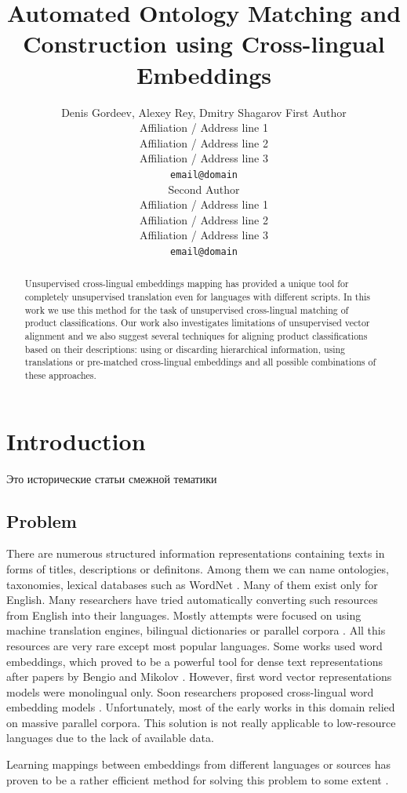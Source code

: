 \documentclass[11pt,a4paper]{article}
\title{Automated Ontology Matching and Construction using Cross-lingual Embeddings}
\author{Denis Gordeev, Alexey Rey, Dmitry Shagarov
	First Author \\
  Affiliation / Address line 1 \\
  Affiliation / Address line 2 \\
  Affiliation / Address line 3 \\
  \texttt{email@domain} \\\And
  Second Author \\
  Affiliation / Address line 1 \\
  Affiliation / Address line 2 \\
  Affiliation / Address line 3 \\
  \texttt{email@domain} \\}
\date{}
\begin{document}
\maketitle
\begin{abstract}
Unsupervised cross-lingual embeddings mapping has provided a unique tool for completely unsupervised translation even for languages with different scripts. In this work we use this method for the task of unsupervised cross-lingual matching of product classifications. Our work also investigates limitations of unsupervised vector alignment and we also suggest several techniques for aligning product classifications based on their descriptions: using or discarding hierarchical information, using translations or pre-matched cross-lingual embeddings and all possible combinations of these approaches.
\end{abstract}

\section{Introduction}
\foreignlanguage{russian}{Это исторические статьи смежной тематики}
\subsection{Problem}
There are numerous structured information representations containing texts in forms of titles, descriptions or definitons. Among them we can name ontologies, taxonomies, lexical databases such as WordNet \cite{wordnet}. Many of them exist only for English. Many researchers have tried automatically converting such resources from English into their languages. Mostly attempts were focused on using machine translation engines, bilingual dictionaries or parallel corpora \cite{Khodak2017,NEALE18.1030}. All this resources are very rare except most popular languages. Some works used word embeddings, which proved to be a powerful tool for dense text representations after papers by Bengio \cite{bengio} and Mikolov \cite{mikolov-representations-2013}. However, first word vector representations models were monolingual only. Soon researchers proposed cross-lingual word embedding models \cite{mikolov-parallel,lazaridou-parallel}. Unfortunately, most of the early works in this domain relied on massive parallel corpora. This solution is not really applicable to low-resource languages due to the lack of available data.

Learning mappings between embeddings from different languages or sources has proven to be a rather efficient method for solving this problem to some extent \cite{ruder-survey}.
\end{document}
